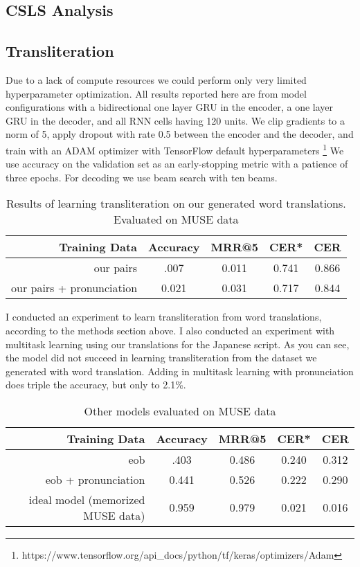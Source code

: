 \documentclass{article}
\begin{document}
\subsection*{CSLS Analysis}

\subsection*{Transliteration}

Due to a lack of compute resources we could perform
only very limited hyperparameter optimization.
All results reported here are from model configurations
with a bidirectional one layer GRU in the encoder,
a one layer GRU in the decoder,
and all RNN cells having 120 units.
We clip gradients to a norm of 5,
apply dropout with rate 0.5 between the encoder and the decoder,
and train with an ADAM optimizer with TensorFlow default hyperparameters
\footnote{https://www.tensorflow.org/api\_docs/python/tf/keras/optimizers/Adam}
We use accuracy on the validation set as an early-stopping metric
with a patience of three epochs.
For decoding we use beam search with ten beams.

\begin{table}[h]
  \centering
  \begin{tabular}{r | c c c c}
    Training Data & Accuracy & MRR@5 & CER* & CER \\
    \midrule
    our pairs & .007 & 0.011 & 0.741 & 0.866 \\
    our pairs + pronunciation & 0.021 & 0.031 & 0.717 & 0.844 \\
  \end{tabular}
  \caption{Results of learning transliteration on our generated word
    translations. Evaluated on MUSE data}
\end{table}

I conducted an experiment to learn transliteration from word translations,
according to the methods section above.
I also conducted an experiment with multitask learning
using our translations for the Japanese script.
As you can see,
the model did not succeed in learning transliteration
from the dataset we generated with word translation.
Adding in multitask learning with pronunciation does triple the accuracy,
but only to 2.1\%.

\begin{table}[h]
  \centering
  \begin{tabular}{r | c c c c}
    Training Data & Accuracy & MRR@5 & CER* & CER \\
    \midrule
    eob & .403 & 0.486 & 0.240 & 0.312 \\
    eob + pronunciation & 0.441 & 0.526 & 0.222 & 0.290 \\
    \midrule
    ideal model (memorized MUSE data) & 0.959 & 0.979 & 0.021 & 0.016\\
  \end{tabular}
  \caption{Other models evaluated on MUSE data}
\end{table}
\end{document}
